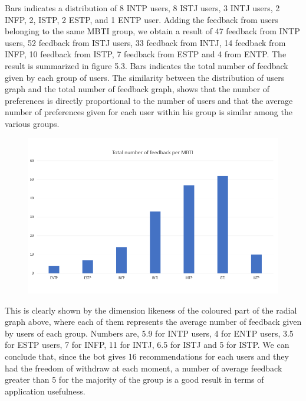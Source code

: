 \documentclass[b5paper,10pt,twoside,cucitura]{toptesi}
\begin{document}
Bars indicates a distribution of 8 INTP users, 8 ISTJ users, 3 INTJ users, 2 INFP, 2, ISTP, 2 ESTP, and 1 ENTP user. Adding the feedback from users belonging to the same MBTI group, we obtain a result of 47 feedback from INTP users, 52 feedback from ISTJ users, 33 feedback from INTJ, 14 feedback from INFP, 10 feedback from ISTP, 7 feedback from ESTP and 4 from ENTP. The result is summarized in figure 5.3. Bars indicates the total number of feedback given by each group of users. The similarity between the distribution of users graph and the total number of feedback graph, shows that the number of preferences is directly proportional to the number of users and that the average number of preferences given for each user within his group is similar among the various groups.

\pagebreak
\begin{figure}[ht]
\centering
\includegraphics[scale=0.5]{feedback_per_MBTI.png}
\end{figure}

This is clearly shown by the dimension likeness of the coloured part of the radial graph above, where each of them represents the average number of feedback given by users of each group. Numbers are, 5.9 for INTP users, 4 for ENTP users, 3.5 for ESTP users, 7 for INFP, 11 for INTJ, 6.5 for ISTJ and 5 for ISTP. We can conclude that, since the bot gives 16 recommendations for each users and they had the freedom of withdraw at each moment, a number of average feedback greater than 5 for the majority of the group is a good result in terms of application usefulness.    
\end{document}
